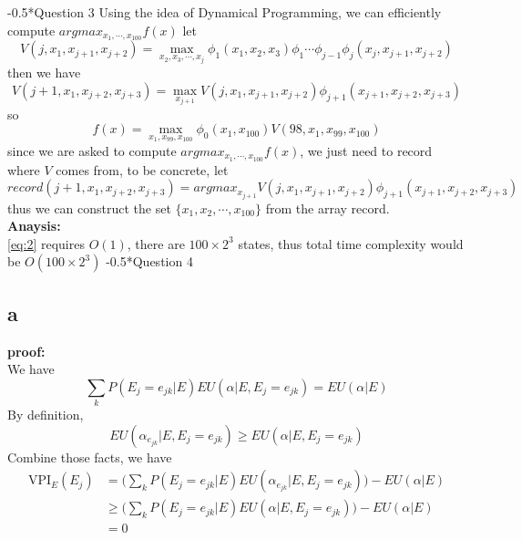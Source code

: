 \documentclass[12pt]{amsart}
\makeatletter
\renewcommand{\section}{\@startsection{section}{1}{0mm}
{-\baselineskip}{0.5\baselineskip}{\bf\leftline}}
\makeatother
\begin{document}
\section*{Question 3}
Using the idea of Dynamical Programming, we can efficiently 
compute $argmax_{x_1,\cdots,x_{100}}f(x)$
let
\begin{equation}
  \label{eq:1}
V(j,x_1,x_{j+1},x_{j+2}) = \max_{x_2,x_3,\cdots,x_j}\phi_1(x_1,x_2,x_3)
\phi_1\cdots\phi_{j-1}\phi_j(x_j,x_{j+1},x_{j+2})  
\end{equation}
then we have
\begin{equation}
  \label{eq:2}
V(j+1,x_1,x_{j+2},x_{j+3}) = \max_{x_{j+1}}V(j,x_1,x_{j+1},x_{j+2})
\phi_{j+1}(x_{j+1},x_{j+2},x_{j+3})  
\end{equation}
so 
\begin{equation}
  \label{eq:3}
  f(x) = \max_{x_1,x_{99},x_{100}}\phi_0(x_1,x_{100})V(98,x_1,x_{99},x_{100})
\end{equation}
since we are asked to compute $argmax_{x_1,\cdots,x_{100}}f(x)$, we just need to record where $V$ comes from, to be concrete,
let
\begin{equation}
  \label{eq:4}
record(j+1,x_1,x_{j+2},x_{j+3}) = argmax_{x_{j+1}}V(j,x_1,x_{j+1},x_{j+2})
\phi_{j+1}(x_{j+1},x_{j+2},x_{j+3})    
\end{equation}
thus we can construct the set $\{x_1,x_2,\cdots,x_{100}\}$ from the array record.\\
\textbf{Anaysis:}\\
\eqref{eq:2} requires $O(1)$, there are $100\times 2^3$ states, thus total time complexity would be $O(100\times 2^3)$
\section*{Question 4}
\subsection*{a}
\textbf{proof:}\\
We have
$$
\sum_k P(E_j = e_{jk}|E)EU(\alpha|E,E_j = e_{jk}) = EU(\alpha|E)
$$
By definition,
$$
EU(\alpha_{e_{jk}}|E, E_j = e_{jk}) \geq EU(\alpha|E, E_j = e_{jk})
$$
Combine those facts, we have
\begin{align*}
\mbox{VPI}_E(E_j) &= \bigg ( \sum_k P(E_j = e_{jk}|E)EU(\alpha_{e_{jk}}|E,E_j = e_{jk}) \bigg ) - EU(\alpha|E)\\
&\geq \bigg (\sum_k P(E_j = e_{jk}|E)EU(\alpha|E, E_j = e_{jk}) \bigg )  - EU(\alpha|E) \\
&= 0
\end{align*}
\end{document}
